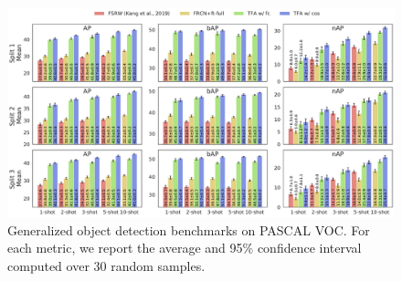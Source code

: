 
\begin{figure}[ht]
	\begin{center}
		\centerline{\includegraphics[width=\linewidth]{figs/pascal_benchmark_full.pdf}}
		\vspace{-5mm}
		\caption{Generalized object detection benchmarks on PASCAL VOC. For each metric, we report the average and 95\% confidence interval computed over 30 random samples.}
		\label{fig:voc_bench}
	\end{center}
	\vspace{-10mm}
\end{figure}

